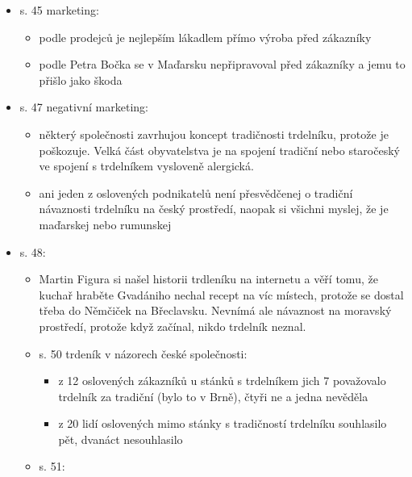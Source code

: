 \begin{itemize}
\begin{itemize}
    \begin{itemize}
    \tightlist
    \item
      Radek Klein z trdlokafé poprvý ochutnal v Ivani na výlovu rybníka
    \end{itemize}
  \item
    s. 45 marketing:

    \begin{itemize}
    \tightlist
    \item
      podle prodejců je nejlepším lákadlem přímo výroba před zákazníky
    \item
      podle Petra Bočka se v Maďarsku nepřipravoval před zákazníky a
      jemu to přišlo jako škoda
    \end{itemize}
  \item
    s. 47 negativní marketing:

    \begin{itemize}
    \tightlist
    \item
      některý společnosti zavrhujou koncept tradičnosti trdelníku,
      protože je poškozuje. Velká část obyvatelstva je na spojení
      tradiční nebo staročeský ve spojení s trdelníkem vysloveně
      alergická.
    \item
      ani jeden z oslovených podnikatelů není přesvědčenej o tradiční
      návaznosti trdelníku na český prostředí, naopak si všichni myslej,
      že je maďarskej nebo rumunskej
    \end{itemize}
  \item
    s. 48:

    \begin{itemize}
    \tightlist
    \item
      Martin Figura si našel historii trdleníku na internetu a věří
      tomu, že kuchař hraběte Gvadániho nechal recept na víc místech,
      protože se dostal třeba do Němčiček na Břeclavsku. Nevnímá ale
      návaznost na moravský prostředí, protože když začínal, nikdo
      trdelník neznal.
    \item
      s. 50 trdeník v názorech české společnosti:

      \begin{itemize}
      \tightlist
      \item
        z 12 oslovených zákazníků u stánků s trdelníkem jich 7
        považovalo trdelník za tradiční (bylo to v Brně), čtyři ne a
        jedna nevěděla
      \item
        z 20 lidí oslovených mimo stánky s tradičností trdelníku
        souhlasilo pět, dvanáct nesouhlasilo
      \end{itemize}
    \item
      s. 51:


\end{itemize}
\end{itemize}
\end{itemize}
